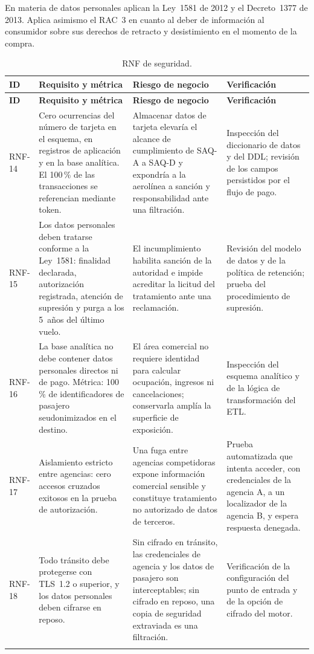 \documentclass[10pt,letterpaper]{article}
\begin{document}
En materia de datos personales aplican la Ley~1581 de 2012 y el Decreto~1377 de 2013. Aplica asimismo el RAC~3 en cuanto al deber de información al consumidor sobre sus derechos de retracto y desistimiento en el momento de la compra.

\begin{longtable}{@{}L{1.5cm} L{5.0cm} L{4.6cm} L{4.9cm}@{}}
\toprule \textbf{ID} & \textbf{Requisito y métrica} & \textbf{Riesgo de negocio} & \textbf{Verificación} \\ \midrule \endfirsthead
\toprule \textbf{ID} & \textbf{Requisito y métrica} & \textbf{Riesgo de negocio} & \textbf{Verificación} \\ \midrule \endhead
RNF-14 & Cero ocurrencias del número de tarjeta en el esquema, en registros de aplicación y en la base analítica. El 100\,\% de las transacciones se referencian mediante token. & Almacenar datos de tarjeta elevaría el alcance de cumplimiento de SAQ-A a SAQ-D y expondría a la aerolínea a sanción y responsabilidad ante una filtración. & Inspección del diccionario de datos y del DDL; revisión de los campos persistidos por el flujo de pago. \\
RNF-15 & Los datos personales deben tratarse conforme a la Ley~1581: finalidad declarada, autorización registrada, atención de supresión y purga a los 5~años del último vuelo. & El incumplimiento habilita sanción de la autoridad e impide acreditar la licitud del tratamiento ante una reclamación. & Revisión del modelo de datos y de la política de retención; prueba del procedimiento de supresión. \\
RNF-16 & La base analítica no debe contener datos personales directos ni de pago. Métrica: 100\,\% de identificadores de pasajero seudonimizados en el destino. & El área comercial no requiere identidad para calcular ocupación, ingresos ni cancelaciones; conservarla amplía la superficie de exposición. & Inspección del esquema analítico y de la lógica de transformación del ETL. \\
RNF-17 & Aislamiento estricto entre agencias: cero accesos cruzados exitosos en la prueba de autorización. & Una fuga entre agencias competidoras expone información comercial sensible y constituye tratamiento no autorizado de datos de terceros. & Prueba automatizada que intenta acceder, con credenciales de la agencia A, a un localizador de la agencia B, y espera respuesta denegada. \\
RNF-18 & Todo tránsito debe protegerse con TLS~1.2 o superior, y los datos personales deben cifrarse en reposo. & Sin cifrado en tránsito, las credenciales de agencia y los datos de pasajero son interceptables; sin cifrado en reposo, una copia de seguridad extraviada es una filtración. & Verificación de la configuración del punto de entrada y de la opción de cifrado del motor. \\
\bottomrule
\caption{RNF de seguridad.}
\end{longtable}
\end{document}
